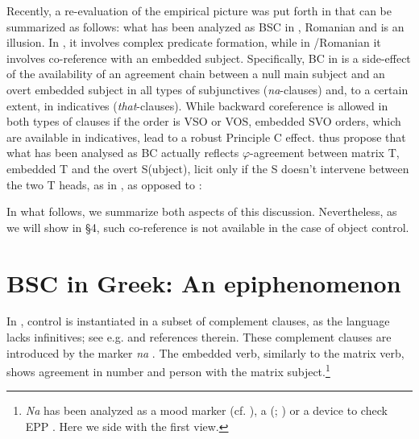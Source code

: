 \documentclass[output=paper]{langsci/langscibook}
\begin{document}
Recently, a re-evaluation of the empirical picture was put forth in \citet{Tsakali2017} that can be summarized as follows: what has been analyzed as BSC in , Romanian and  is an illusion. In , it involves complex predicate formation, while in \slash Romanian it involves co-reference with an embedded subject. Specifically, BC in  is a side-effect of the availability of an agreement chain between a null main subject and an overt embedded subject in all types of subjunctives (\textit{na}{}-clauses) and, to a certain extent, in indicatives (\textit{that}{}-clauses). While backward coreference is allowed in both types of clauses if the order is VSO or VOS, embedded SVO orders, which are available in indicatives, lead to a robust Principle C effect. \citet{Tsakali2017} thus propose that what has been analysed as BC actually reflects $\varphi ${}-agreement between matrix T, embedded T and the overt S(ubject), licit only if the S doesn’t intervene between the two T heads, as in , as opposed to :

\ea%
    \label{ex:alexiadou:2}
    \z
\z    

In what follows, we summarize both aspects of this discussion. Nevertheless, as we will show in §4, such co-reference is not available in the case of object control.

\section{BSC in Greek: An epiphenomenon}%

In , control is instantiated in a subset of  complement clauses, as the language lacks infinitives; see e.g. \citet{Varlokosta1994} and references therein. These  complement clauses are introduced by the  marker \textit{na} . The embedded verb, similarly to the matrix verb, shows agreement in number and person with the matrix subject.\footnote{\textit{Na} has been analyzed as a  mood marker (cf. \citealt{Philippaki-Warburton1984}), a   (\citealt{Agouraki1991}; \citealt{Tsoulas1993}) or a device to check EPP \citep{Roussou2009}. Here we side with the first view.} 
\end{document}
